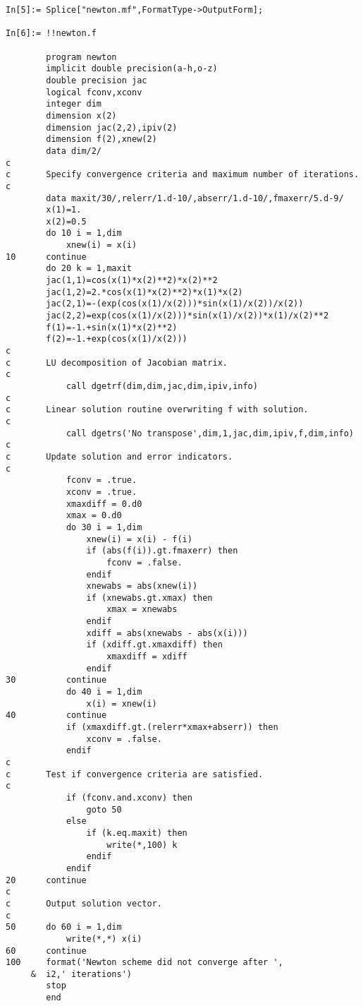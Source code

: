 \documentclass [12pt,twoside]{article}
\begin{document}
\pagebreak[2]

\begin{verbatim}
In[5]:= Splice["newton.mf",FormatType->OutputForm];

In[6]:= !!newton.f

        program newton
        implicit double precision(a-h,o-z)
        double precision jac
        logical fconv,xconv
        integer dim
        dimension x(2)
        dimension jac(2,2),ipiv(2)
        dimension f(2),xnew(2)
        data dim/2/
c
c       Specify convergence criteria and maximum number of iterations.
c
        data maxit/30/,relerr/1.d-10/,abserr/1.d-10/,fmaxerr/5.d-9/
        x(1)=1.
        x(2)=0.5
        do 10 i = 1,dim
            xnew(i) = x(i)
10      continue
        do 20 k = 1,maxit
        jac(1,1)=cos(x(1)*x(2)**2)*x(2)**2
        jac(1,2)=2.*cos(x(1)*x(2)**2)*x(1)*x(2)
        jac(2,1)=-(exp(cos(x(1)/x(2)))*sin(x(1)/x(2))/x(2))
        jac(2,2)=exp(cos(x(1)/x(2)))*sin(x(1)/x(2))*x(1)/x(2)**2
        f(1)=-1.+sin(x(1)*x(2)**2)
        f(2)=-1.+exp(cos(x(1)/x(2)))
c
c       LU decomposition of Jacobian matrix.
c
            call dgetrf(dim,dim,jac,dim,ipiv,info)
c
c       Linear solution routine overwriting f with solution.
c
            call dgetrs('No transpose',dim,1,jac,dim,ipiv,f,dim,info)
c
c       Update solution and error indicators.
c
            fconv = .true.
            xconv = .true.
            xmaxdiff = 0.d0
            xmax = 0.d0
            do 30 i = 1,dim
                xnew(i) = x(i) - f(i)
                if (abs(f(i)).gt.fmaxerr) then
                    fconv = .false.
                endif
                xnewabs = abs(xnew(i))
                if (xnewabs.gt.xmax) then
                    xmax = xnewabs
                endif
                xdiff = abs(xnewabs - abs(x(i)))
                if (xdiff.gt.xmaxdiff) then
                    xmaxdiff = xdiff
                endif
30          continue
            do 40 i = 1,dim
                x(i) = xnew(i)
40          continue
            if (xmaxdiff.gt.(relerr*xmax+abserr)) then
                xconv = .false.
            endif
c
c       Test if convergence criteria are satisfied.
c
            if (fconv.and.xconv) then
                goto 50
            else
                if (k.eq.maxit) then
                    write(*,100) k
                endif
            endif
20      continue
c
c       Output solution vector.
c
50      do 60 i = 1,dim
            write(*,*) x(i)
60      continue
100     format('Newton scheme did not converge after ',
     &  i2,' iterations')
        stop
        end
\end{verbatim}
\end{document}
